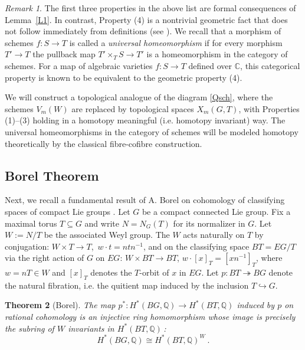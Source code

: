 \documentclass[11pt]{amsart}
\newtheorem{theorem}{Theorem}[section]
\theoremstyle{definition}
\theoremstyle{remark}
\newtheorem{remark}[theorem]{Remark}
\numberwithin{equation}{section}
\newcommand{\la}{\label}
\def\c{\mathbb{C}}
\def\Q{\mathbb{Q}}
\begin{document}
\begin{remark}
The first three properties in the above list are formal consequences of Lemma~\ref{L1}.  
In contrast, Property (4) is a nontrivial geometric fact that does not follow immediately from definitions (see \cite[Lemma 7.3]{BEG03}). We recall that a morphism of schemes $ f: S \to T $ is called a {\it universal homeomorphism} if for every morphism $ T' \to T $ the pullback map $ T' \times_T S \to T' $ is a homeomorphism in the category of schemes. For a map of algebraic varieties $ f: S \to T $ defined over $\c $, this categorical property is known to be equivalent to the geometric property (4).
\end{remark}
%

We will construct a topological analogue of the diagram \eqref{Qsch}, where the schemes $ V_m(W) $ are replaced by topological spaces $X_m(G,T)$, with Properties (1)--(3) holding 
in a homotopy meaningful (i.e. homotopy invariant) way. The universal homeomorphisms in the category of schemes will be modeled homotopy theoretically by the classical fibre-cofibre construction.

\subsection{Borel Theorem}
\la{S3.2}
Next, we recall a fundamental result of A. Borel on cohomology of classifying spaces of compact Lie groups  \cite{Bo53}.
Let $G$ be a compact connected Lie group. Fix a maximal torus $ T \subseteq G $ and write $ N = N_G(T)$ for its normalizer in $G$. Let $W:= N/T$ be the associated Weyl group. The $W$ acts naturally on $T$ by conjugation: $W \times T \rightarrow T$, $\,w \cdot t = ntn^{-1}$, and on the classifying space $BT=EG/T$ via the right action of $G$ on $EG$: $W \times BT \rightarrow BT$, $w \cdot [x]_T = [x n^{-1}]_T$, where $w=nT \in W$ and $[x]_T$ denotes the $T$-orbit of $x$ in $EG$. Let $p: BT \twoheadrightarrow BG$ denote the natural fibration, 
i.e. the quitient map induced by the inclusion $T \hookrightarrow G$.

\begin{theorem}[Borel] \la{tborel}
The map $p^{\ast} : H^\ast(BG , \Q) \to H^{\ast}(BT , \Q)$ induced by $p$ on rational cohomology is an injective ring homomorphism whose image is precisely the subring of $W$ invariants in $ H^{\ast}(BT, \Q)\,$:
%
\begin{equation} \la{borelbg} H^\ast(BG , \Q) \cong H^{\ast}(BT , \Q)^{W}\ . \end{equation} 
%
\end{theorem}
\end{document}
